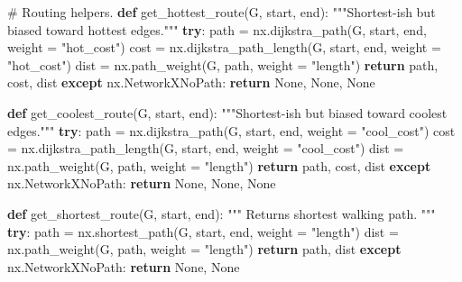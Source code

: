 \documentclass[
]{report}
\newenvironment{Shaded}{\begin{snugshade}}{\end{snugshade}}
\newcommand{\CommentTok}[1]{\textcolor[rgb]{0.37,0.37,0.37}{#1}}
\newcommand{\ControlFlowTok}[1]{\textcolor[rgb]{0.00,0.23,0.31}{\textbf{#1}}}
\newcommand{\KeywordTok}[1]{\textcolor[rgb]{0.00,0.23,0.31}{\textbf{#1}}}
\newcommand{\NormalTok}[1]{\textcolor[rgb]{0.00,0.23,0.31}{#1}}
\newcommand{\OperatorTok}[1]{\textcolor[rgb]{0.37,0.37,0.37}{#1}}
\newcommand{\StringTok}[1]{\textcolor[rgb]{0.13,0.47,0.30}{#1}}
\newcommand{\VariableTok}[1]{\textcolor[rgb]{0.07,0.07,0.07}{#1}}
\begin{document}
\begin{Shaded}
\begin{Highlighting}[]
\CommentTok{\# Routing helpers.}
\KeywordTok{def}\NormalTok{ get\_hottest\_route(G, start, end):}
    \CommentTok{"""Shortest{-}ish but biased toward hottest edges."""}
    \ControlFlowTok{try}\NormalTok{:}
\NormalTok{        path }\OperatorTok{=}\NormalTok{ nx.dijkstra\_path(G, start, end, weight }\OperatorTok{=} \StringTok{"hot\_cost"}\NormalTok{)}
\NormalTok{        cost }\OperatorTok{=}\NormalTok{ nx.dijkstra\_path\_length(G, start, end, weight }\OperatorTok{=} \StringTok{"hot\_cost"}\NormalTok{)}
\NormalTok{        dist }\OperatorTok{=}\NormalTok{ nx.path\_weight(G, path, weight }\OperatorTok{=} \StringTok{"length"}\NormalTok{)}
        \ControlFlowTok{return}\NormalTok{ path, cost, dist}
    \ControlFlowTok{except}\NormalTok{ nx.NetworkXNoPath:}
        \ControlFlowTok{return} \VariableTok{None}\NormalTok{, }\VariableTok{None}\NormalTok{, }\VariableTok{None}

\KeywordTok{def}\NormalTok{ get\_coolest\_route(G, start, end):}
    \CommentTok{"""Shortest{-}ish but biased toward coolest edges."""}
    \ControlFlowTok{try}\NormalTok{:}
\NormalTok{        path }\OperatorTok{=}\NormalTok{ nx.dijkstra\_path(G, start, end, weight }\OperatorTok{=} \StringTok{"cool\_cost"}\NormalTok{)}
\NormalTok{        cost }\OperatorTok{=}\NormalTok{ nx.dijkstra\_path\_length(G, start, end, weight }\OperatorTok{=} \StringTok{"cool\_cost"}\NormalTok{)}
\NormalTok{        dist }\OperatorTok{=}\NormalTok{ nx.path\_weight(G, path, weight }\OperatorTok{=} \StringTok{"length"}\NormalTok{)}
        \ControlFlowTok{return}\NormalTok{ path, cost, dist}
    \ControlFlowTok{except}\NormalTok{ nx.NetworkXNoPath:}
        \ControlFlowTok{return} \VariableTok{None}\NormalTok{, }\VariableTok{None}\NormalTok{, }\VariableTok{None}

\KeywordTok{def}\NormalTok{ get\_shortest\_route(G, start, end):}
    \CommentTok{"""}
\CommentTok{    Returns shortest walking path.}
\CommentTok{    """}
    \ControlFlowTok{try}\NormalTok{:}
\NormalTok{        path }\OperatorTok{=}\NormalTok{ nx.shortest\_path(G, start, end, weight }\OperatorTok{=} \StringTok{"length"}\NormalTok{)}
\NormalTok{        dist }\OperatorTok{=}\NormalTok{ nx.path\_weight(G, path, weight }\OperatorTok{=} \StringTok{"length"}\NormalTok{)}
        \ControlFlowTok{return}\NormalTok{ path, dist}
    \ControlFlowTok{except}\NormalTok{ nx.NetworkXNoPath:}
        \ControlFlowTok{return} \VariableTok{None}\NormalTok{, }\VariableTok{None}
\end{Highlighting}
\end{Shaded}
\end{document}
